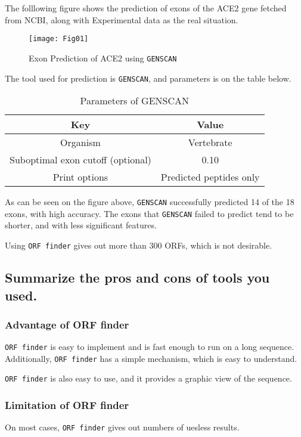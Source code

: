 \documentclass[en,black,10pt,normal]{elegantnote}
\begin{document}
The folllowing figure shows the prediction of exons of the ACE2 gene fetched from NCBI, 
along with Experimental data as the real situation. 

\begin{figure}[H]
    \centering
    \texttt{[image: Fig01]}
    \caption{Exon Prediction of ACE2 using \texttt{GENSCAN}}
    \label{ACE2}
\end{figure}

The tool used for prediction is \texttt{GENSCAN}, and parameters is on the table below.

\begin{table}[H]
    \caption{Parameters of GENSCAN}
    \centering
    \begin{tabular}{cc}
        \toprule
        Key&Value\\
        \midrule
        Organism&Vertebrate\\
        Suboptimal exon cutoff (optional)&0.10\\
        Print options&Predicted peptides only\\
        \bottomrule
    \end{tabular}
\end{table}

As can be seen on the figure above, \texttt{GENSCAN} successfully predicted 14 of the 18 exons,
with high accuracy. The exons that \texttt{GENSCAN} failed to predict tend to be shorter, 
and with less significant features.

Using \texttt{ORF finder} gives out more than 300 ORFs, which is not desirable.

\subsection{Summarize the pros and cons of tools you used.}
\subsubsection{Advantage of ORF finder}
\texttt{ORF finder} is easy to implement and is fast enough to run on a long sequence.
Additionally, \texttt{ORF finder} has a simple mechanism, which is easy to understand.

\texttt{ORF finder} is also easy to use, and it provides a graphic view of the sequence.
\subsubsection{Limitation of ORF finder}
On most cases, \texttt{ORF finder} gives out numbers of uesless results.
\end{document}
